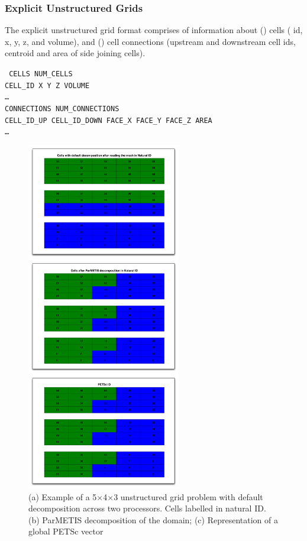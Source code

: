 \subsubsection{Explicit Unstructured Grids}
The explicit unstructured grid format comprises of information about 
({}) cells ( id, x, y, z, and volume), and
({}) cell connections (upstream and downstream cell
ids, centroid and area of side joining cells).

{\tt
\hspace{-0.8cm}CELLS NUM\_CELLS\\
CELL\_ID X Y Z VOLUME\\
\dots\\
CONNECTIONS NUM\_CONNECTIONS \\
CELL\_ID\_UP CELL\_ID\_DOWN FACE\_X FACE\_Y FACE\_Z AREA \\
\dots\\
}

\begin{figure}[H]\centering
\includegraphics[width=0.6\textwidth]{./figs/5x4x3_domain}
\caption{
(a) Example of a 5$\times$4$\times$3 unstructured grid problem 
with default decomposition across two processors. Cells labelled in natural ID.
(b) ParMETIS decomposition of the domain; 
(c) Representation of a global PETSc vector}
\label{fig:543_domain_decomp}
\end{figure}


